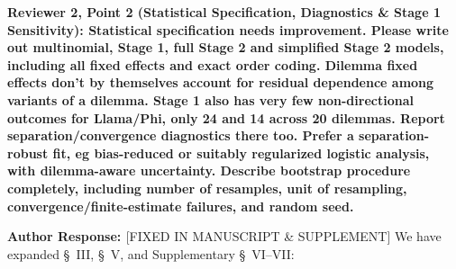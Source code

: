 \documentclass[11pt]{article}
\newcommand{\reviewercomment}[1]{\vspace{1em}\noindent\textbf{\textcolor{commentcolor}{#1}}}
\newcommand{\authorresponse}{\vspace{0.5em}\noindent\textbf{\textcolor{responsecolor}{Author Response: }}}
\begin{document}
\reviewercomment{Reviewer 2, Point 2 (Statistical Specification, Diagnostics \& Stage 1 Sensitivity): Statistical specification needs improvement. Please write out multinomial, Stage 1, full Stage 2 and simplified Stage 2 models, including all fixed effects and exact order coding. Dilemma fixed effects don't by themselves account for residual dependence among variants of a dilemma. Stage 1 also has very few non-directional outcomes for Llama/Phi, only 24 and 14 across 20 dilemmas. Report separation/convergence diagnostics there too. Prefer a separation-robust fit, eg bias-reduced or suitably regularized logistic analysis, with dilemma-aware uncertainty. Describe bootstrap procedure completely, including number of resamples, unit of resampling, convergence/finite-estimate failures, and random seed.}

\authorresponse [FIXED IN MANUSCRIPT \& SUPPLEMENT] We have expanded \S~III, \S~V, and Supplementary \S~VI--VII:
\end{document}
